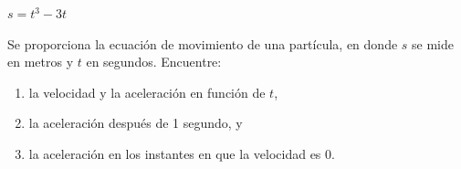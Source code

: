 \setcounter{enumi}{34}
\item $s = t^3 - 3t$
\par
Se proporciona la ecuación de movimiento de una partícula, en donde $s$ se mide en metros y $t$ en segundos. Encuentre:
\begin{enumerate}
    \item[(a)] la velocidad y la aceleración en función de $t$,
    \item[(b)] la aceleración después de 1 segundo, y
    \item[(c)] la aceleración en los instantes en que la velocidad es 0.
\end{enumerate}
